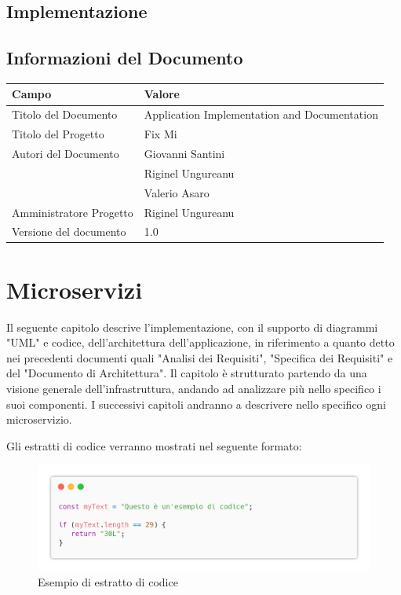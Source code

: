 \documentclass{report}
\begin{document}
	
	\section{Implementazione}
	
	\section{Informazioni del Documento}
	
	\begin{center} %
		\centering
		\begin{tabular}{ |p{4cm}|p{4cm}|  }
			\hline
			\centering Campo & \qquad\qquad Valore \\ %
			\hline
			Titolo del Documento & Application Implementation and Documentation \\
			\hline
			Titolo del Progetto & Fix Mi \\
			\hline
			Autori del Documento &
			Giovanni Santini \\ & Riginel Ungureanu \\ & Valerio Asaro \\
			\hline
			Amministratore Progetto & Riginel Ungureanu\\
			\hline
			Versione del documento & 1.0 \\
			\hline
		\end{tabular}
	\end{center}
	
	
	
\chapter{Microservizi}

Il seguente capitolo descrive l'implementazione, con il supporto di diagrammi "UML" e codice, dell'architettura dell'applicazione, in riferimento a quanto detto nei precedenti documenti quali "Analisi dei Requisiti", "Specifica dei Requisiti" e del "Documento di Architettura".  Il capitolo è strutturato partendo da una visione generale dell'infrastruttura, andando ad analizzare più nello specifico i suoi componenti. I successivi capitoli andranno a descrivere nello specifico ogni microservizio.


Gli estratti di codice verranno mostrati nel seguente formato:
\begin{figure}[H]
	\centering\includegraphics[width=1\textwidth]{images/example_code_01.png}
	Esempio di estratto di codice
\end{figure}
\end{document}
